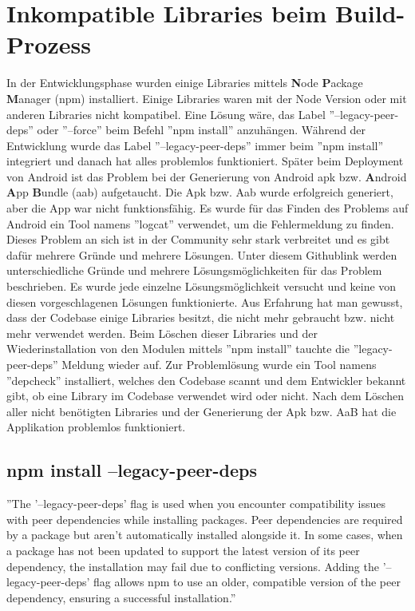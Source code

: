 \section{Inkompatible Libraries beim Build-Prozess}\label{sec:inkompatible-libraries-beim-build-prozess}
In der Entwicklungsphase wurden einige Libraries mittels \textbf{N}ode  \textbf{P}ackage \textbf{M}anager (npm) installiert.
Einige Libraries waren mit der Node Version oder mit anderen Libraries nicht kompatibel.
Eine Lösung wäre, das Label ''--legacy-peer-deps'' oder ''--force'' beim Befehl ''npm install'' anzuhängen.
Während der Entwicklung wurde das Label ''--legacy-peer-deps'' immer beim ''npm install'' integriert
und danach hat alles problemlos funktioniert.
Später beim Deployment von Android ist das Problem
bei der Generierung von Android apk bzw.
\textbf{A}ndroid \textbf{A}pp \textbf{B}undle (aab) aufgetaucht.
Die Apk bzw.
Aab wurde erfolgreich generiert, aber die App war nicht funktionsfähig.
Es wurde für das Finden des Problems auf Android ein Tool namens ''logcat'' verwendet,
um die Fehlermeldung zu finden.
Dieses Problem an sich ist in der Community sehr stark verbreitet und es gibt dafür mehrere Gründe und mehrere Lösungen.
Unter diesem Githublink \cite{libjsexecutor} werden unterschiedliche Gründe und mehrere
Lösungsmöglichkeiten für das Problem beschrieben.
Es wurde jede einzelne Lösungsmöglichkeit versucht und keine von diesen vorgeschlagenen Lösungen
funktionierte.
Aus Erfahrung hat man gewusst, dass der Codebase einige Libraries besitzt,
die nicht mehr gebraucht bzw.
nicht mehr verwendet werden. Beim Löschen dieser Libraries und der Wiederinstallation
von den Modulen mittels ''npm install'' tauchte die ''legacy-peer-deps'' Meldung wieder auf.
Zur Problemlösung wurde ein Tool namens ''depcheck'' installiert,
welches den Codebase scannt und dem Entwickler bekannt gibt, ob eine Library im Codebase verwendet
wird oder nicht. \cite{depcheck}
Nach dem Löschen aller nicht benötigten Libraries und der Generierung der
Apk bzw.
AaB hat die Applikation problemlos funktioniert.



\subsection{npm install --legacy-peer-deps}\label{subsec:npm-install---legacy-peer-deps}
''The '--legacy-peer-deps' flag is used when you encounter compatibility issues with peer dependencies
while installing packages.
Peer dependencies are required by a package but aren't automatically
installed alongside it.
In some cases, when a package has not been updated to support the latest
version of its peer dependency, the installation may fail due to conflicting versions.
Adding the '--legacy-peer-deps' flag allows npm to use an older, compatible version of
the peer dependency, ensuring a successful installation.''
\cite{installFlags}


